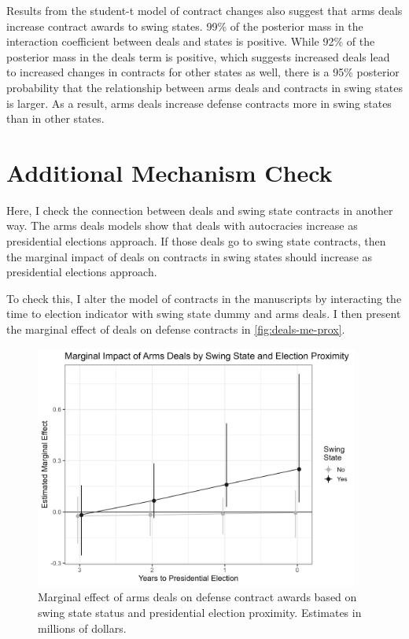 \documentclass[12pt]{article}
\begin{document}
Results from the student-t model of contract changes also suggest that arms deals increase contract awards to swing states. 
99\% of the posterior mass in the interaction coefficient between deals and states is positive.
While 92\% of the posterior mass in the deals term is positive, which suggests increased deals lead to increased changes in contracts for other states as well, there is a 95\% posterior probability that the relationship between arms deals and contracts in swing states is larger. 
As a result, arms deals increase defense contracts more in swing states than in other states. 


\newpage 

\section{Additional Mechanism Check}

Here, I check the connection between deals and swing state contracts in another way. 
The arms deals models show that deals with autocracies increase as presidential elections approach. 
If those deals go to swing state contracts, then the marginal impact of deals on contracts in swing states should increase as presidential elections approach. 


To check this, I alter the model of contracts in the manuscripts by interacting the time to election indicator with swing state dummy and arms deals. 
I then present the marginal effect of deals on defense contracts in \autoref{fig:deals-me-prox}. 


\begin{figure}[htpb]
	\centering
		\includegraphics[width=0.95\textwidth]{deals-me-prox.png}
	\caption{Marginal effect of arms deals on defense contract awards based on swing state status and presidential election proximity. Estimates in millions of dollars.}
	\label{fig:deals-me-prox}
\end{figure}
\end{document}
